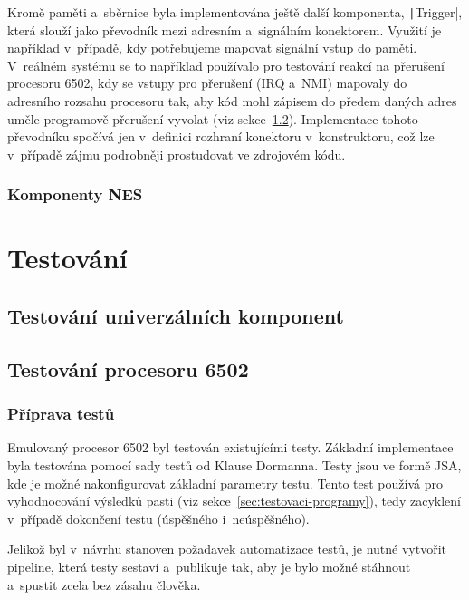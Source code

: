 Kromě paměti a~sběrnice byla implementována ještě další komponenta, \texttt|Trigger|, která slouží jako převodník mezi adresním a~signálním konektorem. Využití je například v~případě, kdy potřebujeme mapovat signální vstup do paměti. V~reálném systému se to například používalo pro testování reakcí na přerušení procesoru 6502, kdy se vstupy pro přerušení (IRQ a~NMI) mapovaly do adresního rozsahu procesoru tak, aby kód mohl zápisem do předem daných adres uměle-programově přerušení vyvolat (viz sekce~\ref{sec:test-procesor}). Implementace tohoto převodníku spočívá jen v~definici rozhraní konektoru v~konstruktoru, což lze v~případě zájmu podrobněji prostudovat ve zdrojovém kódu.

\subsection{Komponenty NES}


\chapter{Testování}

\section{Testování univerzálních komponent}

\section{Testování procesoru 6502}
\label{sec:test-procesor}
\subsection{Příprava testů}
Emulovaný procesor 6502 byl testován existujícími testy. Základní implementace byla testována pomocí sady testů od Klause Dormanna. Testy jsou ve formě JSA, kde je možné nakonfigurovat základní parametry testu. Tento test používá pro vyhodnocování výsledků pasti (viz sekce~\ref{sec:testovaci-programy}), tedy zacyklení v~případě dokončení testu (úspěšného i~neúspěšného).

Jelikož byl v~návrhu stanoven požadavek automatizace testů, je nutné vytvořit pipeline, která testy sestaví a~publikuje tak, aby je bylo možné stáhnout a~spustit zcela bez zásahu člověka.

